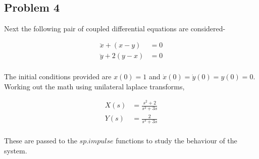 \documentclass[a4paper, 12pt, margin= 1.25cm]{article}
\begin{document}
    \begin{center}
    \end{center}
    { \hspace*{\fill} \\}
    
    \begin{center}
    \end{center}
    { \hspace*{\fill} \\}
    
    \begin{center}
    \end{center}
    { \hspace*{\fill} \\}
    
    \begin{center}
    \end{center}
    { \hspace*{\fill} \\}
    
    \subsection{Problem 4}\label{problem-4}

Next the following pair of coupled differential equations are
considered-

\begin{align}
\ddot{x}+ (x-y) &= 0\\
\ddot{y} + 2(y-x) &= 0\\
\end{align}

The initial conditions provided are $x(0)=1$ and
$\dot{x}(0)= \dot{y}(0)=y(0)=0$. Working out the math using unilateral
laplace transforms,

\begin{align}
X(s)&= \frac{s^2+2}{s^3+3s}\\
Y(s)&= \frac{2}{s^3+3s}\\
\end{align}

These are passed to the $sp.impulse$ functions to study the behaviour of
the system.
\end{document}

